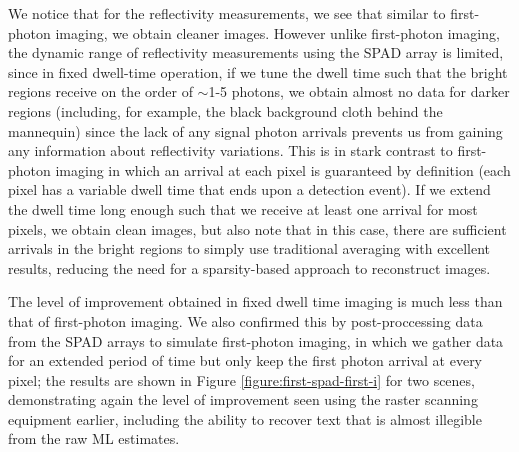 We notice that for the reflectivity measurements, we see that similar to first-photon imaging, we obtain cleaner images. However unlike first-photon imaging, the dynamic range of reflectivity measurements using the SPAD array is limited, since in fixed dwell-time operation, if we tune the dwell time such that the bright regions receive on the order of $\sim$1-5 photons, we obtain almost no data for darker regions (including, for example, the black background cloth behind the mannequin) since the lack of any signal photon arrivals prevents us from gaining any information about reflectivity variations. This is in stark contrast to first-photon imaging in which an arrival at each pixel is guaranteed by definition (each pixel has a variable dwell time that ends upon a detection event). If we extend the dwell time long enough such that we receive at least one arrival for most pixels, we obtain clean images, but also note that in this case, there are sufficient arrivals in the bright regions to simply use traditional averaging with excellent results, reducing the need for a sparsity-based approach to reconstruct images.

The level of improvement obtained in fixed dwell time imaging is much less than that of first-photon imaging. We also confirmed this by post-proccessing data from the SPAD arrays to simulate first-photon imaging, in which we gather data for an extended period of time but only keep the first photon arrival at every pixel; the results are shown in Figure \ref{figure:first-spad-first-i} for two scenes, demonstrating again the level of improvement seen using the raster scanning equipment earlier, including the ability to recover text that is almost illegible from the raw ML estimates.

